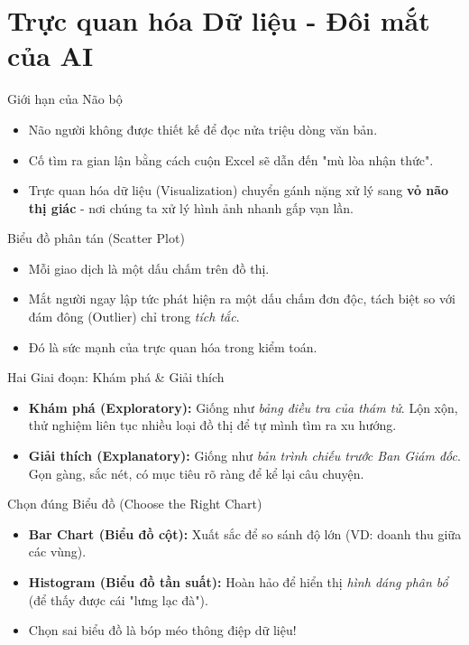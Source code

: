 \documentclass[aspectratio=169,12pt]{beamer}
\begin{document}
\section{Trực quan hóa Dữ liệu - Đôi mắt của AI}
\begin{frame}
    \tableofcontents[currentsection]
\end{frame}

\begin{frame}{Giới hạn của Não bộ}
    \begin{itemize}
        \item Não người không được thiết kế để đọc nửa triệu dòng văn bản.
        \item Cố tìm ra gian lận bằng cách cuộn Excel sẽ dẫn đến "mù lòa nhận thức".
        \item Trực quan hóa dữ liệu (Visualization) chuyển gánh nặng xử lý sang \textbf{vỏ não thị giác} - nơi chúng ta xử lý hình ảnh nhanh gấp vạn lần.
    \end{itemize}
\end{frame}

\begin{frame}{Biểu đồ phân tán (Scatter Plot)}
    \begin{itemize}
        \item Mỗi giao dịch là một dấu chấm trên đồ thị.
        \item Mắt người ngay lập tức phát hiện ra một dấu chấm đơn độc, tách biệt so với đám đông (Outlier) chỉ trong \textit{tích tắc}.
        \item Đó là sức mạnh của trực quan hóa trong kiểm toán.
    \end{itemize}
\end{frame}

\begin{frame}{Hai Giai đoạn: Khám phá \& Giải thích}
    \begin{itemize}
        \item \textbf{Khám phá (Exploratory):} Giống như \textit{bảng điều tra của thám tử}. Lộn xộn, thử nghiệm liên tục nhiều loại đồ thị để tự mình tìm ra xu hướng.
        \item \textbf{Giải thích (Explanatory):} Giống như \textit{bản trình chiếu trước Ban Giám đốc}. Gọn gàng, sắc nét, có mục tiêu rõ ràng để kể lại câu chuyện.
    \end{itemize}
\end{frame}

\begin{frame}{Chọn đúng Biểu đồ (Choose the Right Chart)}
    \begin{itemize}
        \item \textbf{Bar Chart (Biểu đồ cột):} Xuất sắc để so sánh độ lớn (VD: doanh thu giữa các vùng).
        \item \textbf{Histogram (Biểu đồ tần suất):} Hoàn hảo để hiển thị \textit{hình dáng phân bổ} (để thấy được cái "lưng lạc đà").
        \item Chọn sai biểu đồ là bóp méo thông điệp dữ liệu!
    \end{itemize}
\end{frame}
\end{document}

